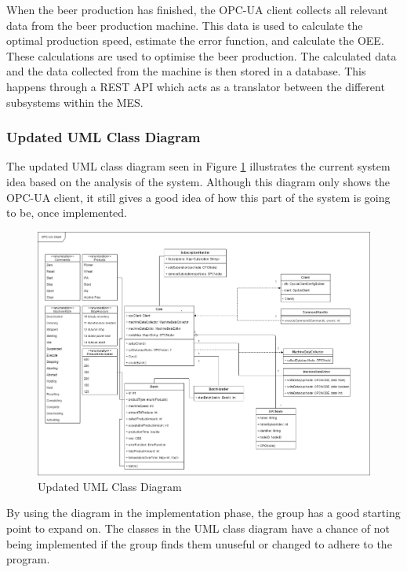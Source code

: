 When the beer production has finished, the OPC-UA client collects all relevant
data from the beer production machine. This data is used to calculate the
optimal production speed, estimate the error function, and calculate the OEE.
These calculations are used to optimise the beer production. The calculated data
and the data collected from the machine is then stored in a database. This
happens through a REST API which acts as a translator between the different 
subsystems within the MES.

\subsubsection{Updated UML Class Diagram}
The updated UML class diagram seen in Figure
\ref{figure:updated_UML_class_diagram} illustrates the current system idea based
on the analysis of the system. Although this diagram only shows the 
OPC-UA client, it still gives a good idea of how this part of the system is going
to be, once implemented.

\begin{figure}[ht]
\centering 
\includegraphics[scale=0.3]{images/diagrams/updated_UML_Class_Diagram.drawio.png}
\caption{Updated UML Class Diagram}
\label{figure:updated_UML_class_diagram} 
\end{figure}

By using the diagram in the implementation phase, the group has a good starting 
point to expand on. The classes in the UML class diagram have a chance of not 
being implemented if the group finds them unuseful or changed to adhere to the 
program.